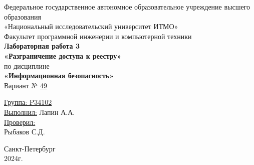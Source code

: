 \documentclass[a4paper, 14pt]{report}
\begin{document}
\newcommand{\nchapter}[1]{%
    \chapter*{#1} %
    \addcontentsline{toc}{chapter}{#1} %
}
\newcommand{\nsubsection}[1]{%
    \subsection*{#1} %
    \addcontentsline{toc}{subsection}{#1} %
}
\makeatletter

\renewcommand{\tableofcontents}{%
    \chapter*{\contentsname}%
    \addcontentsline{toc}{chapter}{\contentsname}%
    \@starttoc{toc}%
}
\makeatother

\begin{titlepage}
    \centering
    {\large Федеральное государственное автономное образовательное учреждение высшего образования}\\
    {\large «Национальный исследовательский университет ИТМО»}\\[0.5cm]

    {\large Факультет программной инженерии и компьютерной техники}\\[3cm]

    {\large \bfseries Лабораторная работа 3}\\[0.5cm]
    {\large \bfseries «Разграничение доступа к реестру»}\\[0.5cm]
    {\large по дисциплине}\\[0.5cm]
    {\large \bfseries «Информационная безопасность»}\\[1cm]

    {\large Вариант № \underline{49}}\\[5cm]
    \begin{flushright}
        {\large \underline{Группа: P34102}}\\[0.5cm]
        {\large \underline{Выполнил:} Лапин А.А.}\\[1cm]

        {\large \underline{Проверил:}}\\
        {\large Рыбаков С.Д.}\\[7cm]
    \end{flushright}

    {\large Санкт-Петербург}\\
    {\large 2024г.}
\end{titlepage}
\end{document}
